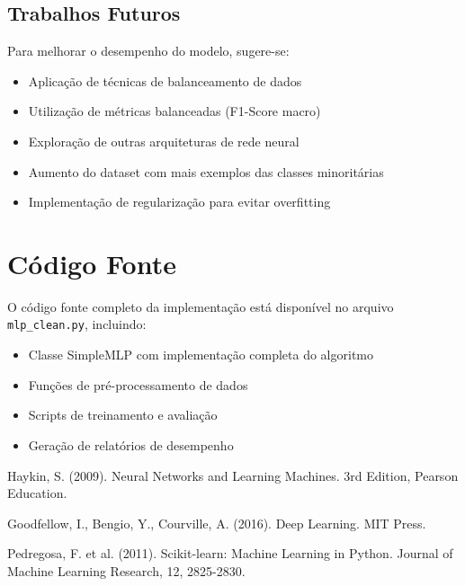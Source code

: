 \documentclass[12pt]{article}
\begin{document}
\subsection{Trabalhos Futuros}

Para melhorar o desempenho do modelo, sugere-se:
\begin{itemize}
    \item Aplicação de técnicas de balanceamento de dados
    \item Utilização de métricas balanceadas (F1-Score macro)
    \item Exploração de outras arquiteturas de rede neural
    \item Aumento do dataset com mais exemplos das classes minoritárias
    \item Implementação de regularização para evitar overfitting
\end{itemize}

\section{Código Fonte}

O código fonte completo da implementação está disponível no arquivo \texttt{mlp\_clean.py}, incluindo:
\begin{itemize}
    \item Classe SimpleMLP com implementação completa do algoritmo
    \item Funções de pré-processamento de dados
    \item Scripts de treinamento e avaliação
    \item Geração de relatórios de desempenho
\end{itemize}


\begin{thebibliography}{1}

Haykin, S. (2009). Neural Networks and Learning Machines. 3rd Edition, Pearson Education.

Goodfellow, I., Bengio, Y., Courville, A. (2016). Deep Learning. MIT Press.

Pedregosa, F. et al. (2011). Scikit-learn: Machine Learning in Python. Journal of Machine Learning Research, 12, 2825-2830.

\end{thebibliography}
\end{document}
